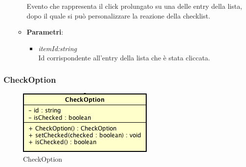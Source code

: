 \begin{itemize}
\begin{itemize}
	Evento che rappresenta il click prolungato su una delle entry della lista, dopo il quale si può personalizzare la reazione della checklist.
		\item{\textbf{Parametri}: \begin{itemize}
		\item \textit{itemId:string}\\
		Id corrispondente all'entry della lista che è stata cliccata.
		\end{itemize}}
	\end{itemize}
\end{itemize}

\subsubsection{CheckOption}

\label{CheckOption}
\begin{figure}[ht]
	\centering
	\includegraphics[scale=0.5]{Sezioni/SottosezioniST/img/CheckOption.png}
	\caption{CheckOption}
\end{figure}

